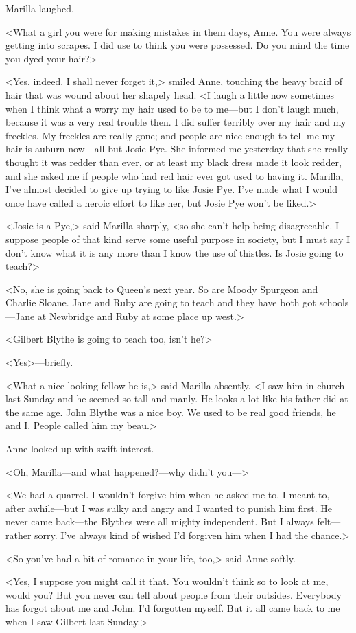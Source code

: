 Marilla laughed.

<What a girl you were for making mistakes in them days, Anne. You were always getting into scrapes. I did use to think you were possessed. Do you mind the time you dyed your hair?>

<Yes, indeed. I shall never forget it,> smiled Anne, touching the heavy braid of hair that was wound about her shapely head. <I laugh a little now sometimes when I think what a worry my hair used to be to me—but I don't laugh much, because it was a very real trouble then. I did suffer terribly over my hair and my freckles. My freckles are really gone; and people are nice enough to tell me my hair is auburn now—all but Josie Pye. She informed me yesterday that she really thought it was redder than ever, or at least my black dress made it look redder, and she asked me if people who had red hair ever got used to having it. Marilla, I've almost decided to give up trying to like Josie Pye. I've made what I would once have called a heroic effort to like her, but Josie Pye won't be liked.>

<Josie is a Pye,> said Marilla sharply, <so she can't help being disagreeable. I suppose people of that kind serve some useful purpose in society, but I must say I don't know what it is any more than I know the use of thistles. Is Josie going to teach?>

<No, she is going back to Queen's next year. So are Moody Spurgeon and Charlie Sloane. Jane and Ruby are going to teach and they have both got schools—Jane at Newbridge and Ruby at some place up west.>

<Gilbert Blythe is going to teach too, isn't he?>

<Yes>—briefly.

<What a nice-looking fellow he is,> said Marilla absently. <I saw him in church last Sunday and he seemed so tall and manly. He looks a lot like his father did at the same age. John Blythe was a nice boy. We used to be real good friends, he and I\@. People called him my beau.>

Anne looked up with swift interest.

<Oh, Marilla—and what happened?—why didn't you—>

<We had a quarrel. I wouldn't forgive him when he asked me to. I meant to, after awhile—but I was sulky and angry and I wanted to punish him first. He never came back—the Blythes were all mighty independent. But I always felt—rather sorry. I've always kind of wished I'd forgiven him when I had the chance.>

<So you've had a bit of romance in your life, too,> said Anne softly.

<Yes, I suppose you might call it that. You wouldn't think so to look at me, would you? But you never can tell about people from their outsides. Everybody has forgot about me and John. I'd forgotten myself. But it all came back to me when I saw Gilbert last Sunday.>